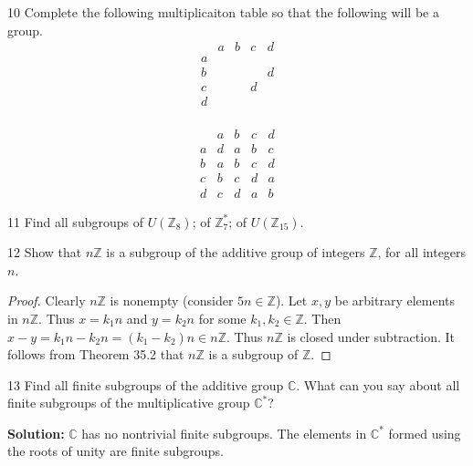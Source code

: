 \begin{problem}{10}
    Complete the following multiplicaiton table so that the following 
    will be a group.
    \[
    \begin{array}{c|cccc}
    & a & b & c & d \\ \hline
    a        &  &  &  &  \\
    b        &  &  &  & d \\
    c        &  &  & d &  \\
    d        &  &  &  &  \\
    \end{array}
    \]
\end{problem}
\solved
\[
\begin{array}{c|cccc}
    & a & b & c & d \\ \hline
a & d & a & b & c \\
b & a & b & c & d \\
c & b & c & d & a \\
d & c & d & a & b
\end{array}
\]

\begin{problem}{11}
    Find all subgroups of $U(\mathbb{Z}_8)$; of $\mathbb{Z}_7^*$; of $U(\mathbb{Z}_{15})$.
\end{problem}
\unsolved

\begin{problem}{12}
    Show that $n \mathbb{Z}$ is a subgroup of the additive group 
    of integers $\mathbb{Z}$, for all integers $n$.
\end{problem}
\solved

\begin{proof}
    Clearly $n \mathbb{Z}$ is nonempty (consider $5n \in \mathbb{Z}$).
    Let $x, y$ be arbitrary elements in $n \mathbb{Z}$.
    Thus $x = k_1 n$ and $y = k_2 n$ for some $k_1, k_2 \in \mathbb{Z}$.
    Then $x - y = k_1 n - k_2 n = (k_1 - k_2)n \in n \mathbb{Z}$.
    Thus $n \mathbb{Z}$ is closed under subtraction.
    It follows from Theorem 35.2 that $n \mathbb{Z}$ is a subgroup of $\mathbb{Z}$.
\end{proof}

\begin{problem}{13}
    Find all finite subgroups of the additive group $\mathbb{C}$.
    What can you say about all finite subgroups of the multiplicative 
    group $\mathbb{C}^*$?
\end{problem}
\solved

\textbf{Solution: } $\mathbb{C}$ has no nontrivial finite subgroups.
The elements in $\mathbb{C}^*$ formed using the roots of unity are finite subgroups.

